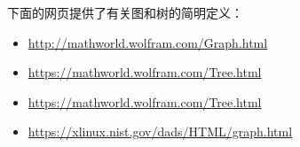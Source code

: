 \begin{tcolorbox}[title=图和树]
下面的网页提供了有关图和树的简明定义：
\begin{itemize}
\item \url{http://mathworld.wolfram.com/Graph.html}
\item \url{https://mathworld.wolfram.com/Tree.html}
\item \url{https://mathworld.wolfram.com/Tree.html}
\item \url{https://xlinux.nist.gov/dads/HTML/graph.html}
\end{itemize}
\end{tcolorbox}






























